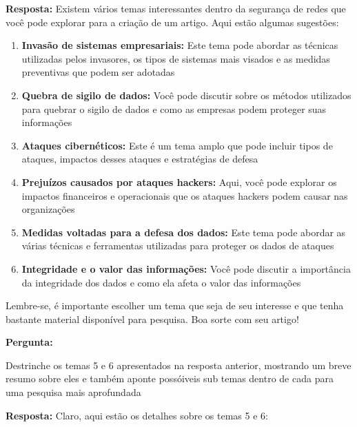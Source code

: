 \documentclass[10pt,conference,twocolumn]{article}
\begin{document}
\textbf{Resposta:}\newline
Existem vários temas interessantes dentro da segurança de redes que você pode explorar para a criação de um artigo. Aqui estão algumas sugestões:\newline
\begin{enumerate}
    \item \textbf{Invasão de sistemas empresariais:} Este tema pode abordar as técnicas utilizadas pelos invasores, os tipos de sistemas mais visados e as medidas preventivas que podem ser adotadas
    \item \textbf{Quebra de sigilo de dados:} Você pode discutir sobre os métodos utilizados para quebrar o sigilo de dados e como as empresas podem proteger suas informações
    \item \textbf{Ataques cibernéticos:} Este é um tema amplo que pode incluir tipos de ataques, impactos desses ataques e estratégias de defesa
    \item \textbf{Prejuízos causados por ataques hackers:} Aqui, você pode explorar os impactos financeiros e operacionais que os ataques hackers podem causar nas organizações
    \item \textbf{Medidas voltadas para a defesa dos dados:} Este tema pode abordar as várias técnicas e ferramentas utilizadas para proteger os dados de ataques
    \item \textbf{Integridade e o valor das informações:} Você pode discutir a importância da integridade dos dados e como ela afeta o valor das informações
\end{enumerate}
Lembre-se, é importante escolher um tema que seja de seu interesse e que tenha bastante material disponível para pesquisa. Boa sorte com seu artigo!\newline

\textbf{Pergunta:}\newline

Destrinche os temas 5 e 6 apresentados na resposta anterior, mostrando um breve resumo sobre eles e também aponte possóiveis sub temas dentro de cada para uma pesquisa mais aprofundada\newline

\textbf{Resposta:}\newline
Claro, aqui estão os detalhes sobre os temas 5 e 6:\newline
\end{document}

